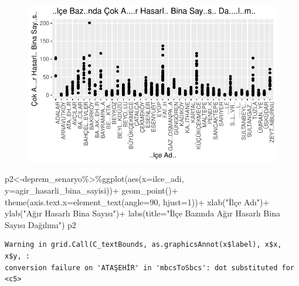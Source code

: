 \documentclass[
  11pt,
  a4paper,
  DIV=11,
  numbers=noendperiod]{scrartcl}
\newenvironment{Shaded}{\begin{snugshade}}{\end{snugshade}}
\newcommand{\AttributeTok}[1]{\textcolor[rgb]{0.40,0.45,0.13}{#1}}
\newcommand{\DecValTok}[1]{\textcolor[rgb]{0.68,0.00,0.00}{#1}}
\newcommand{\FunctionTok}[1]{\textcolor[rgb]{0.28,0.35,0.67}{#1}}
\newcommand{\NormalTok}[1]{\textcolor[rgb]{0.00,0.23,0.31}{#1}}
\newcommand{\OtherTok}[1]{\textcolor[rgb]{0.00,0.23,0.31}{#1}}
\newcommand{\SpecialCharTok}[1]{\textcolor[rgb]{0.37,0.37,0.37}{#1}}
\newcommand{\StringTok}[1]{\textcolor[rgb]{0.13,0.47,0.30}{#1}}
\begin{document}
\begin{figure}[H]

{\centering \includegraphics{project_files/figure-pdf/unnamed-chunk-3-1.pdf}

}

\end{figure}

\begin{Shaded}
\begin{Highlighting}[]
\NormalTok{p2}\OtherTok{\textless{}{-}}\NormalTok{deprem\_senaryo}\SpecialCharTok{\%\textgreater{}\%}\FunctionTok{ggplot}\NormalTok{(}\FunctionTok{aes}\NormalTok{(}\AttributeTok{x=}\NormalTok{ilce\_adi, }\AttributeTok{y=}\NormalTok{agir\_hasarli\_bina\_sayisi))}\SpecialCharTok{+}
  \FunctionTok{geom\_point}\NormalTok{()}\SpecialCharTok{+}
  \FunctionTok{theme}\NormalTok{(}\AttributeTok{axis.text.x=}\FunctionTok{element\_text}\NormalTok{(}\AttributeTok{angle=}\DecValTok{90}\NormalTok{, }\AttributeTok{hjust=}\DecValTok{1}\NormalTok{))}\SpecialCharTok{+}
  \FunctionTok{xlab}\NormalTok{(}\StringTok{"İlçe Adı"}\NormalTok{)}\SpecialCharTok{+}
  \FunctionTok{ylab}\NormalTok{(}\StringTok{"Ağır Hasarlı Bina Sayısı"}\NormalTok{)}\SpecialCharTok{+}
  \FunctionTok{labs}\NormalTok{(}\AttributeTok{title=}\StringTok{"İlçe Bazında Ağır Hasarlı Bina Sayısı Dağılımı"}\NormalTok{)}
\NormalTok{p2}
\end{Highlighting}
\end{Shaded}

\begin{verbatim}
Warning in grid.Call(C_textBounds, as.graphicsAnnot(x$label), x$x, x$y, :
conversion failure on 'ATAŞEHİR' in 'mbcsToSbcs': dot substituted for <c5>
\end{verbatim}
\end{document}
